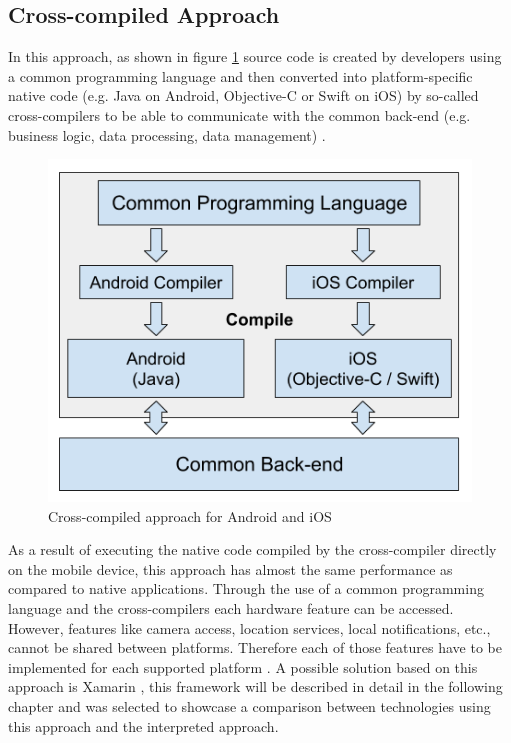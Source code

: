 \documentclass[Bachelor,BIF,english]{twbook}
\begin{document}
\subsection{Cross-compiled Approach}
In this approach, as shown in figure \ref{Fig2} source code is created by developers using a common programming language and then converted into platform-specific native code (e.g. Java on Android, Objective-C or Swift on iOS) by so-called cross-compilers to be able to communicate with the common back-end (e.g. business logic, data processing, data management) \cite[p.~3]{7479278} \cite[p.~3]{7934674}.
\begin{figure}[!htbp]
\centering
\includegraphics[width=0.5\linewidth]{PICs/Cross-Compiled.png}
\caption{Cross-compiled approach for Android and iOS \cite[p.~3]{7479278}}\label{Fig2}
\end{figure}
As a result of executing the native code compiled by the cross-compiler directly on the mobile device, this approach has almost the same performance as compared to native applications. Through the use of a common programming language and the cross-compilers each hardware feature can be accessed. However, features like camera access, location services, local notifications, etc., cannot be shared between platforms. Therefore each of those features have to be implemented for each supported platform \cite[p.~627]{6420693} \cite[p.~3-4]{7479278}. A possible solution based on this approach is Xamarin \cite[p.~3]{7934674}, this framework will be described in detail in the following chapter and was selected to showcase a comparison between technologies using this approach and the interpreted approach.
\end{document}
